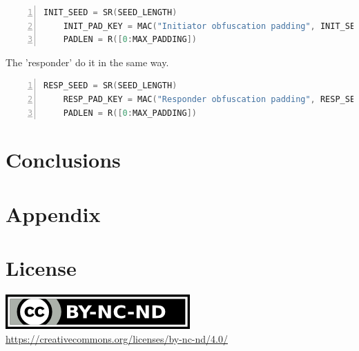 \documentclass[sigconf, screen]{acmart}
\begin{document}
\begin{lstlisting}[language=C,  tabsize=4, numbers=left, xleftmargin=5.0ex, basicstyle=\footnotesize, breakatwhitespace=false, breaklines=true, frame=tb, caption=Generate INIT seed and padding key \cite{TorGitWebObfs2Specification}., label=lst:INIT_seedandpaddingkey]
    INIT_SEED = SR(SEED_LENGTH)
    INIT_PAD_KEY = MAC("Initiator obfuscation padding", INIT_SEED)[:KEYLEN]
    PADLEN = R([0:MAX_PADDING])
\end{lstlisting}

The 'responder' do it in the same way.
\begin{lstlisting}[language=C,  tabsize=4, numbers=left, xleftmargin=5.0ex, basicstyle=\footnotesize, breakatwhitespace=false, breaklines=true, frame=tb, caption=Generate RESP seed and padding key \cite{TorGitWebObfs2Specification}., label=lst:RESP_seedandpaddingkey]
    RESP_SEED = SR(SEED_LENGTH)
    RESP_PAD_KEY = MAC("Responder obfuscation padding", RESP_SEED)[:KEYLEN]
    PADLEN = R([0:MAX_PADDING])
\end{lstlisting}
\section{Conclusions}
\label{s:conclusions}
\appendix
\section{Appendix}
\label{s:appendix}


\section*{License}
\label{s:license}
\begin{center}
	\includegraphics{by-nc-nd.png} \\
	\url{https://creativecommons.org/licenses/by-nc-nd/4.0/}
\end{center}
\end{document}
